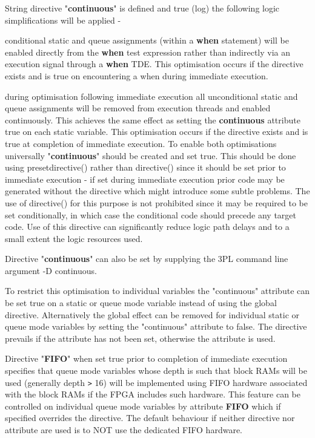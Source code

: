         String directive "{\bf continuous}" is defined and true (log)
        the following logic simplifications will be applied -
        \blist
        \item   conditional static and queue assignments (within a {\bf when}
                statement) will be enabled directly from the {\bf when} test
                expression rather than indirectly via an execution signal
                through a {\bf when} TDE. This optimisation occurs if the
                directive exists and is true on encountering a when during
                immediate execution.
        \item   during optimisation following immediate execution all
                unconditional static and queue assignments will be removed from
                execution threads and enabled continuously. This achieves the
                same effect as setting the {\bf continuous} attribute true on
                each static variable. This optimisation occurs if the
                directive exists and is true at completion of immediate execution.
        \blend
        To enable both optimisations universally "{\bf continuous}"
        should be created and set true. This should be done using
        presetdirective() rather than directive() since it should be set
        prior to immediate execution - if set during immediate execution prior
        code may be generated without the directive which might introduce some
        subtle problems. The use of directive() for this purpose is not
        prohibited since it may be required to be set conditionally, in which
        case the conditional code should precede any  target code. Use of this
        directive can significantly reduce logic path delays and to a small
        extent the logic resources used.

        Directive "{\bf continuous}" can also be set by supplying the 3PL
        command line argument -D continuous.
        
        To restrict this optimisation to individual variables the "continuous"
        attribute can be set true on a static or queue mode variable instead
        of using the global directive. Alternatively the global effect can
        be removed for individual static or queue mode variables by setting
        the "continuous" attribute to false. The directive prevails if the
        attribute has not been set, otherwise the attribute is used.

        Directive "{\bf FIFO}" when set true prior to completion
        of immediate execution specifies that queue mode variables whose depth is
        such that block RAMs will be used (generally depth \verb'>' 16) will be
        implemented using FIFO hardware associated with the block RAMs if the
        FPGA includes such hardware. This feature can be controlled on
        individual queue mode variables by attribute {\bf FIFO} which if
        specified overrides the directive. The default behaviour if neither
        directive nor attribute are used is to NOT use the dedicated FIFO
        hardware.
        
